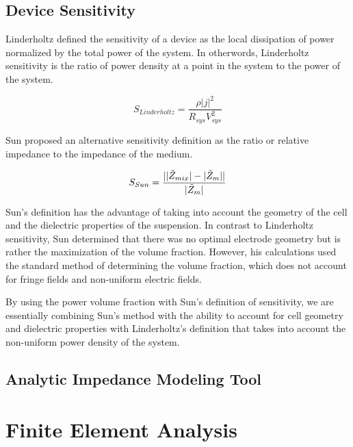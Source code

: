 \subsection{Device Sensitivity}
\par Linderholtz defined the sensitivity of a device as the local dissipation of power normalized by the total power of the system. In otherwords, Linderholtz sensitivity is the ratio of power density at a point in the system to the power of the system.

\begin{equation}
    S_{Linderholtz} = \frac{\rho |j|^2}{R_{sys}V_{sys}^2}
    \label{eqn:Linderholtz}
\end{equation}

\par Sun proposed an alternative sensitivity definition as the ratio or relative impedance to the impedance of the medium.

\begin{equation}
    S_{Sun} = \frac{| |\Tilde{Z}_{mix}| - |\Tilde{Z}_m| |}{|\Tilde{Z}_m|}
\end{equation}

\par Sun's definition has the advantage of taking into account the geometry of the cell and the dielectric properties of the suspension. In contrast to Linderholtz sensitivity, Sun determined that there was no optimal electrode geometry but is rather the maximization of the volume fraction. However, his calculations used the standard method of determining the volume fraction, which does not account for fringe fields and non-uniform electric fields. 

\par By using the power volume fraction with Sun's definition of sensitivity, we are essentially combining Sun's method with the ability to account for cell geometry and dielectric properties with Linderholtz's definition that takes into account the non-uniform power density of the system.

\subsection{Analytic Impedance Modeling Tool}

\section{Finite Element Analysis}

